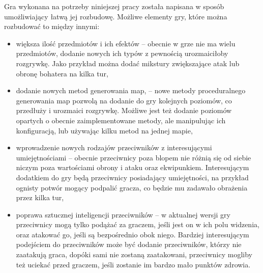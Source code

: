 \documentclass[12pt,twoside]{article}
\begin{document}
Gra wykonana na potrzeby niniejszej pracy została napisana w sposób umożliwiający łatwą jej rozbudowę. Możliwe elementy gry, które można rozbudować to między innymi:
\begin{itemize}
	\item większa ilość przedmiotów i ich efektów -- obecnie w grze nie ma wielu przedmiotów, dodanie nowych ich typów z pewnością urozmaiciłoby rozgrywkę. Jako przykład można dodać mikstury zwiększające atak lub obronę bohatera na kilka tur,
	\item dodanie nowych metod generowania map, -- nowe metody proceduralnego generowania map pozwolą na dodanie do gry kolejnych poziomów, co przedłuży i urozmaici rozgrywkę. Możliwe jest też dodanie poziomów opartych o obecnie zaimplementowane metody, ale manipulując ich konfiguracją, lub używając kilku metod na jednej mapie,
	\item wprowadzenie nowych rodzajów przeciwników z interesującymi umiejętnościami -- obecnie przeciwnicy poza blopem nie różnią się od siebie niczym poza wartościami obrony i ataku oraz ekwipunkiem. Interesującym dodatkiem do gry będą przeciwnicy posiadający umiejętności, na przykład ognisty potwór mogący podpalić gracza, co będzie mu zadawało obrażenia przez kilka tur,
	\item poprawa sztucznej inteligencji przeciwników -- w aktualnej wersji gry przeciwnicy mogą tylko podążać za graczem, jeśli jest on w ich polu widzenia, oraz atakować go, jeśli są bezpośrednio obok niego. Bardziej interesującym podejściem do przeciwników może być dodanie przeciwników, którzy nie zaatakują graca, dopóki sami nie zostaną zaatakowani, przeciwnicy mogliby też uciekać przed graczem, jeśli zostanie im bardzo mało punktów zdrowia.
\end{itemize}


\clearpage



\end{document}

